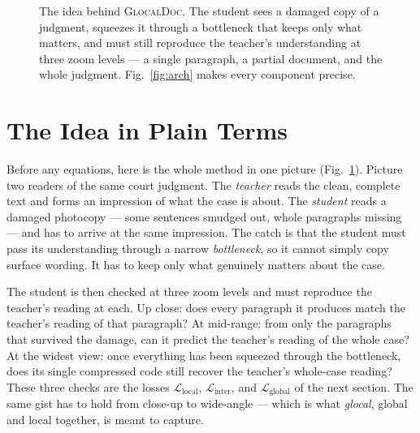 \documentclass[conference]{IEEEtran}
\newcommand{\glocal}{\textsc{GlocalDoc}}
\begin{document}
\begin{figure}[t]
{}
\caption{The idea behind \glocal{}. The student sees a damaged copy of a judgment,
squeezes it through a bottleneck that keeps only what matters, and must still
reproduce the teacher's understanding at three zoom levels --- a single paragraph, a
partial document, and the whole judgment. Fig.~\ref{fig:arch} makes every component
precise.}
\label{fig:concept}
\end{figure}

\section{The Idea in Plain Terms}
\label{sec:overview}
Before any equations, here is the whole method in one picture
(Fig.~\ref{fig:concept}). Picture two readers of the same court judgment. The
\emph{teacher} reads the clean, complete text and forms an impression of what the
case is about. The \emph{student} reads a damaged photocopy --- some sentences
smudged out, whole paragraphs missing --- and has to arrive at the same impression.
The catch is that the student must pass its understanding through a narrow
\emph{bottleneck}, so it cannot simply copy surface wording. It has to keep only
what genuinely matters about the case.

The student is then checked at three zoom levels and must reproduce the teacher's
reading at each. Up close: does every paragraph it produces match the teacher's
reading of that paragraph? At mid-range: from only the paragraphs that survived the
damage, can it predict the teacher's reading of the whole case? At the widest view:
once everything has been squeezed through the bottleneck, does its single compressed
code still recover the teacher's whole-case reading? These three checks are the
losses $\mathcal{L}_{\mathrm{local}}$, $\mathcal{L}_{\mathrm{inter}}$, and
$\mathcal{L}_{\mathrm{global}}$ of the next section. The same gist has to hold from
close-up to wide-angle --- which is what \emph{glocal}, global and local together,
is meant to capture.
\end{document}
